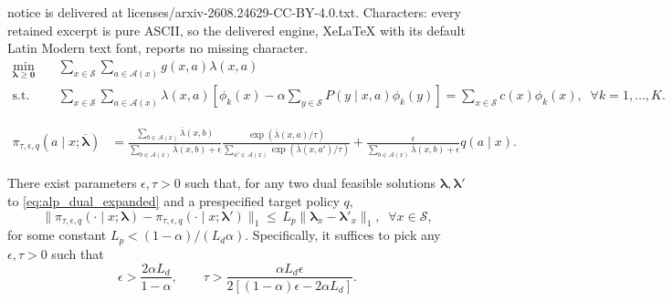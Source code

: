 \documentclass[10pt,a4paper]{amsart}
\providecommand{\blambda}{\boldsymbol{\lambda}}
\providecommand{\bzero}{\boldsymbol{0}}
\begin{document}
notice is delivered at licenses/arxiv-2608.24629-CC-BY-4.0.txt. Characters: every retained excerpt is pure ASCII, so the delivered engine, XeLaTeX with its default Latin Modern text font, reports no missing character.
\begin{equation}
\label{eq:alp_dual_expanded}
\tag{dALP}
\begin{aligned}
  \min_{\blambda\geq\bzero}\quad
  &
  \sum_{x\in\mathcal S}
  \sum_{a\in\mathcal A(x)}
  g(x,a)\lambda(x,a) \\
  \text{s.t.}\quad
  &
  \sum_{x\in\mathcal S}
  \sum_{a\in\mathcal A(x)}
  \lambda(x,a)
  \left[
  \phi_k(x)
  -
  \alpha\sum_{y\in\mathcal S}P(y\mid x,a)\phi_k(y)
  \right]
  =
  \sum_{x\in\mathcal S}c(x)\phi_k(x),
  \;\; \forall k=1,\ldots,K.
\end{aligned}
\end{equation}

\begin{equation}
\label{eq:target_guided_softmax_policy}
\begin{aligned}
\pi_{\tau,\epsilon,q}(a\mid x;\overline{\blambda})
&=
\frac{\sum_{b\in\mathcal A(x)}\overline{\lambda}(x,b)}
     {\sum_{b\in\mathcal A(x)}\overline{\lambda}(x,b)+\epsilon}
\frac{\exp\!\left(\overline{\lambda}(x,a)/\tau\right)}
     {\sum_{a'\in\mathcal A(x)}\exp\!\left(\overline{\lambda}(x,a')/\tau\right)}
+
\frac{\epsilon}
     {\sum_{b\in\mathcal A(x)}\overline{\lambda}(x,b)+\epsilon}
q(a\mid x).
\end{aligned}
\end{equation}

\begin{lemma}
\label{lemma:L_Lipschitz_policy}
There exist parameters $\epsilon, \tau > 0$ such that, for any two dual feasible solutions $\blambda, \blambda'$ to \eqref{eq:alp_dual_expanded} and a prespecified target policy $q$,
\[
\lVert \pi_{\tau,\epsilon,q}(\cdot \mid x;\blambda) - \pi_{\tau,\epsilon,q}(\cdot\mid x; \blambda') \rVert_1\le \, L_p \lVert \blambda_x - \blambda'_x \rVert_1, 
\;\; \forall x \in\mathcal S, 
\]
for some constant $L_p < (1-\alpha)/(L_d\alpha)$. Specifically, it suffices to pick any $\epsilon, \tau > 0$ such that  
\begin{equation}
\label{eq:epsilon_tau_conditions}
  \epsilon
  >
  \frac{2\alpha L_d}{1-\alpha},
  \qquad
  \tau
  >
  \frac{\alpha L_d\epsilon}
  {2\left[(1-\alpha)\epsilon-2\alpha L_d\right]}.
\end{equation}
\end{lemma}
\end{document}
